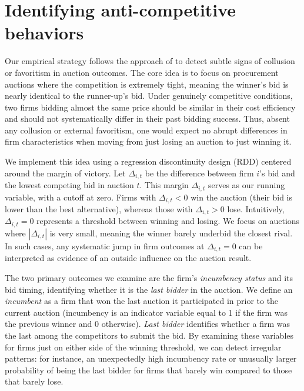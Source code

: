 \section{Identifying anti-competitive behaviors}\label{coll}
Our empirical strategy follows the approach of \citet{kawai2023using} to detect subtle signs of collusion or favoritism in auction outcomes. The core idea is to focus on procurement auctions where the competition is extremely tight, meaning the winner's bid is nearly identical to the runner-up's bid. Under genuinely competitive conditions, two firms bidding almost the same price should be similar in their cost efficiency and should not systematically differ in their past bidding success. Thus, absent any collusion or external favoritism, one would expect no abrupt differences in firm characteristics when moving from just losing an auction to just winning it.

We implement this idea using a regression discontinuity design (RDD) centered around the margin of victory. Let $\Delta_{i,t}$ be the difference between firm $i$'s bid and the lowest competing bid in auction $t$. This margin $\Delta_{i,t}$ serves as our running variable, with a cutoff at zero. Firms with $\Delta_{i,t} < 0$ win the auction (their bid is lower than the best alternative), whereas those with $\Delta_{i,t} > 0$ lose. Intuitively, $\Delta_{i,t} = 0$ represents a threshold between winning and losing. We focus on auctions where $|\Delta_{i,t}|$ is very small, meaning the winner barely underbid the closest rival. In such cases, any systematic jump in firm outcomes at $\Delta_{i,t}=0$ can be interpreted as evidence of an outside influence on the auction result.

The two primary outcomes we examine are the firm's \emph{incumbency status} and its bid timing, identifying whether it is the \emph{last bidder} in the auction. We define an \textit{incumbent} as a firm that won the last auction it participated in prior to the current auction (incumbency is an indicator variable equal to 1 if the firm was the previous winner and 0 otherwise). \textit{Last bidder} identifies whether a firm was the last among the competitors to submit the bid. By examining these variables for firms just on either side of the winning threshold, we can detect irregular patterns: for instance, an unexpectedly high incumbency rate or unusually larger probability of being the last bidder for firms that barely win compared to those that barely lose.

